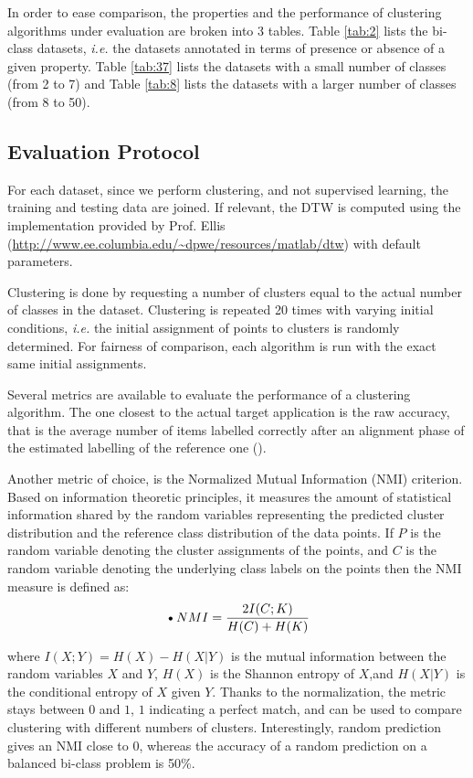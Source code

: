 \documentclass[a4paper,twoside]{article}
\begin{document}
In order to ease comparison, the properties and the performance of clustering algorithms under evaluation are broken into 3 tables. Table \ref{tab:2} lists the bi-class datasets, \textit{i.e.} the datasets annotated in terms of presence or absence of a given property. Table \ref{tab:37} lists the datasets with a small number of classes (from 2 to 7) and Table \ref{tab:8} lists the datasets with a larger number of classes (from 8 to 50). 

\subsection{Evaluation Protocol}

For each dataset, since we perform clustering, and not supervised learning, the training and testing data are joined. If relevant, the DTW is computed using the implementation provided by Prof. Ellis (\url{http://www.ee.columbia.edu/~dpwe/resources/matlab/dtw}) with default parameters.

Clustering is done by requesting a number of clusters equal to the actual number of classes in the dataset. Clustering is repeated 20 times with varying initial conditions, \textit{i.e.} the initial assignment of points to clusters is randomly determined. For fairness of comparison, each algorithm is run with the exact same initial assignments.

Several metrics are available to evaluate the performance of a clustering algorithm. The one closest to the actual target application is the raw accuracy, that is the average number of items  labelled
correctly after an alignment phase of the estimated labelling of the reference one (\cite{Kuhn1955Hungarian}).

Another metric of choice, is the Normalized Mutual Information (NMI) criterion. Based on information theoretic principles, it measures the amount of statistical information shared by the random variables representing the predicted cluster distribution and the reference class distribution of the data points. If $P$ is the random variable denoting the cluster assignments of the points, and $C$ is the random variable denoting the underlying class labels on the points then the NMI measure is defined as:
\begin{equation}
\textbf{•}{NMI} = \frac{ 2\- I(C;K) }{H(C)+H(K)}
\end{equation}

where $I(X;Y)=H(X)−H(X|Y)$ is the mutual information between the random variables $X$ and $Y$, $H(X)$ is the Shannon entropy of $X$,and $H(X|Y)$ is the conditional entropy of $X$ given $Y$. Thanks to the normalization, the metric stays between $0$ and $1$, $1$ indicating a perfect match, and can be used to compare clustering with different numbers of clusters. Interestingly, random prediction gives an NMI close to $0$, whereas the accuracy of a random prediction on a balanced bi-class problem is 50\%.
\end{document}
